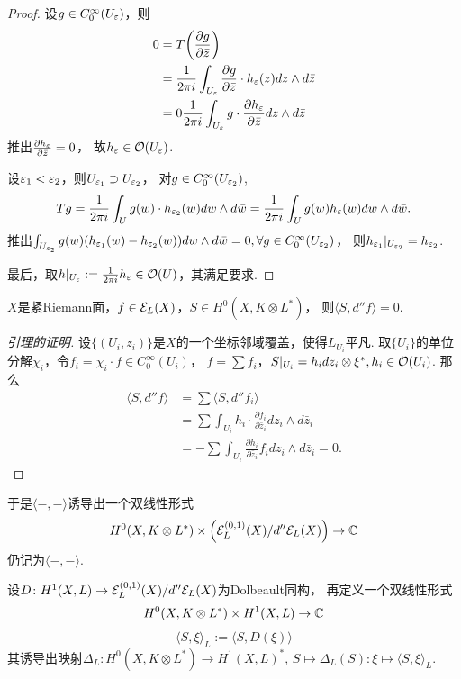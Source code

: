 \begin{proof}
	设$g\in C^\infty_0(U_\varepsilon)$，则
	\begin{align*}
		0&=T\bigg(\frac{\partial g}{\partial \bar{z}}\bigg)\\
		&=\frac{1}{2\pi i}\int_{U_\varepsilon} \frac{\partial g}{\partial \bar{z}}\cdot h_\varepsilon (z)dz\wedge d\bar{z}\\
		&=0\frac{1}{2\pi i} \int_{U_\varepsilon} g\cdot \frac{\partial h_\varepsilon}{\partial \bar{z}} dz\wedge d\bar{z}			
	\end{align*}
	推出$\frac{\partial h_\varepsilon}{\partial \bar{z}}=0$，
    故$h_\varepsilon \in \mathcal{O}(U_\varepsilon)$.

	设$\varepsilon_1<\varepsilon_2$，则$U_{\varepsilon_1}\supset U_{\varepsilon_2}$，
    对$g\in C^\infty_0(U_{\varepsilon_2})$,
	$$Tg=\frac{1}{2\pi i}\int_U g(w)\cdot h_{\varepsilon_2}(w)dw\wedge d\bar{w}
    =\frac{1}{2\pi i} \int_U g(w)h_\varepsilon(w) dw\wedge d\bar{w}.$$
	推出$\int_{U_{\varepsilon_2}} g(w)(h_{\varepsilon_1}(w)-h_{\varepsilon_2}(w))dw\wedge d\bar{w}=0, 
    \forall g\in C^\infty_0(U_{\varepsilon_2})$，
    则$h_{\varepsilon_1}|_{U_{\varepsilon_2}}=h_{\varepsilon_2}$.

	最后，取$h|_{U_\varepsilon}:=\frac{1}{2\pi i} h_\varepsilon\in \mathcal{O}(U)$，其满足要求.	
\end{proof}

\begin{lemma}
	$X$是紧Riemann面，$f\in \mathcal{E}_L(X)$，$S\in H^0(X,K\otimes L^*)$，
    则$\langle S, d''f\rangle =0$.
\end{lemma}

\begin{proof}[引理的证明]
	设$\{(U_i,z_i)\}$是$X$的一个坐标邻域覆盖，使得$L_{U_i}$平凡. 
    取$\{U_i\}$的单位分解$\chi_i$，令$f_i=\chi_i \cdot f\in C^\infty_0(U_i)$，
    $f=\sum f_i$，$S|_{U_i}=h_i dz_i \otimes \xi^*, h_i \in \mathcal{O}(U_i)$. 那么
	\begin{align*}
		\langle S, d''f\rangle &=\sum \langle S, d''f_i \rangle\\
		&=\sum \int_{U_i} h_i \cdot \frac{\partial f_i}{\partial \bar{z}_i}dz_i \wedge d\bar{z}_i\\
		&=-\sum \int_{U_i} \frac{\partial h_i}{\partial \bar{z}_i} f_i dz_i \wedge d\bar{z}_i=0.
	\end{align*}
\end{proof}
 
\begin{definition}
	于是$\langle -,- \rangle $诱导出一个双线性形式
	$$H^0(X, K\otimes L^*)\times \left(\mathcal{E}^{(0,1)}_L(X)/d''\mathcal{E}_L(X)\right) \rightarrow  \mathbb{C}$$
	仍记为$\langle -,- \rangle$.

	设$D\colon H^1(X,L)\rightarrow \mathcal{E}^{(0,1)}_L(X)/d''\mathcal{E}_L(X)$为Dolbeault同构，
    再定义一个双线性形式
	$$H^0(X,K\otimes L^*)\times H^1(X,L)\rightarrow \mathbb{C}$$
	$$\langle S, \xi \rangle_L:=\langle S, D(\xi)\rangle$$
	其诱导出映射$\Delta_L\colon H^0(X, K\otimes L^*)\rightarrow H^1(X,L)^*$, 
    $S\mapsto \Delta_L(S)\colon \xi \mapsto \langle S, \xi \rangle_L$.
\end{definition}

